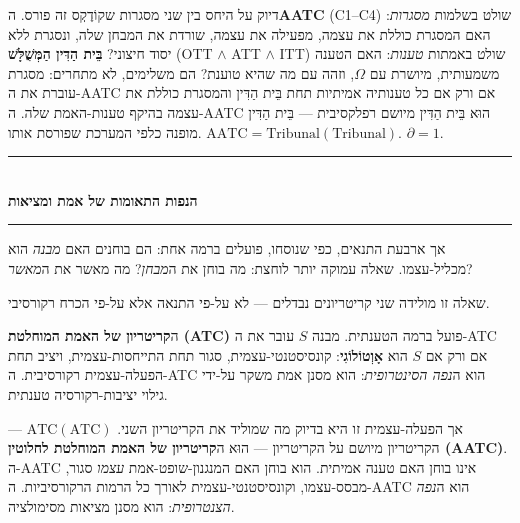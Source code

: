 \documentclass[10pt, openany, oneside]{book}
\renewcommand{\normalsize}{\fontsize{10}{13}\selectfont}
\begin{document}
דיוק על היחס בין שני מסגרות שקוֹדֶקְס זה פורס. ה\textbf{AATC} (C1–C4) שולט בשלמות \textit{מסגרות}: האם המסגרת כוללת את עצמה, מפעילה את עצמה, שורדת את המבחן שלה, ונסגרת ללא יסוד חיצוני? \textbf{בֵּית הַדִּין הַמְּשֻׁלָּשׁ} (OTT $\wedge$ ATT $\wedge$ ITT) שולט באמתות \textit{טענות}: האם הטענה משמעותית, מיושרת עם $\Omega$, וזהה עם מה שהיא טוענת? הם משלימים, לא מתחרים: מסגרת עוברת את ה-AATC אם ורק אם כל טענותיה אמיתיות תחת בֵּית הַדִּין והמסגרת כוללת את עצמה בהיקף טענות-האמת שלה. ה-AATC הוּא בֵּית הַדִּין מיושם רפלקסיבית — בֵּית הַדִּין מופנה כלפי המערכת שפורסת אותו. $\text{AATC} = \text{Tribunal}(\text{Tribunal})$. $\partial = 1$.

\vspace{1.5em}


\begin{center}
    \rule{0.3\textwidth}{0.4pt}\\[0.5em]
    {\normalsize\bfseries\textsc{הנפות התאומות של אמת ומציאות}}\\[0.3em]
    \rule{0.3\textwidth}{0.4pt}
\end{center}

\vspace{1em}

\noindent אך ארבעת התנאים, כפי שנוסחו, פועלים ברמה אחת: הם בוחנים האם \textit{מבנה} הוא מכליל-עצמו. שאלה עמוקה יותר לוחצת: מה בוחן את ה\textit{מבחן}? מה מאשר את ה\textit{מאשר}?

שאלה זו מולידה שני קריטריונים נבדלים — לא על-פי התנאה אלא על-פי הכרח רקורסיבי.

ה\textbf{קריטריון של האמת המוחלטת (ATC)} פועל ברמה הטענתית. מבנה $S$ עובר את ה-ATC אם ורק אם $S$ הוא \textbf{אָוְטוֹלוֹגִי}: קונסיסטנטי-עצמית, סגור תחת התייחסות-עצמית, ויציב תחת הפעלה-עצמית רקורסיבית. ה-ATC הוא ה\textit{נפה הסינטרופית}: הוא מסנן אמת משקר על-ידי גילוי יציבות-רקורסיה טענתית.

אך הפעלה-עצמית זו היא בדיוק מה שמוליד את הקריטריון השני. $\text{ATC}(\text{ATC})$ — הקריטריון מיושם על הקריטריון — הוּא ה\textbf{קריטריון של האמת המוחלטת לחלוטין (AATC)}. ה-AATC אינו בוחן האם טענה אמיתית. הוא בוחן האם המנגנון-שופט-אמת \textit{עצמו} סגור, מבסס-עצמו, וקונסיסטנטי-עצמית לאורך כל הרמות הרקורסיביות. ה-AATC הוא ה\textit{נפה הצנטרופית}: הוא מסנן מציאות מסימולציה.

\vspace{1.5em}

\end{document}
